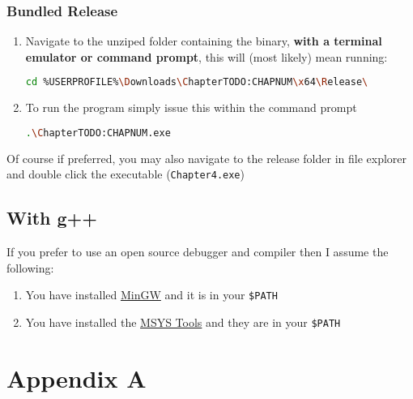 \documentclass[a4paper,11pt]{article}
\begin{document}
      \subsubsection{Bundled Release}
        \begin{enumerate}
          \item Navigate to the unziped folder containing the binary, 
            \textbf{with a terminal emulator or command prompt}, this will
            (most likely) mean running:
            \begin{lstlisting}[language=bash]
              cd %USERPROFILE%\Downloads\ChapterTODO:CHAPNUM\x64\Release\
            \end{lstlisting}
          \item To run the program simply issue this within the command
            prompt
            \begin{lstlisting}[language=bash]
              .\ChapterTODO:CHAPNUM.exe
            \end{lstlisting}
        \end{enumerate}
        Of course if preferred, you may also navigate to the release folder in
          file explorer and double click the executable (\texttt{Chapter4.exe})
      \subsection{With g++}
        If you prefer to use an open source debugger and compiler then I assume
          the following:
          \begin{enumerate}
            \item You have installed \href{http://www.mingw.org/}{MinGW} and
              it is in your \texttt{\$PATH}
            \item You have installed the
            \href{http://www.mingw.org/wiki/MSYS}{MSYS Tools} and they are in
              your \texttt{\$PATH}
          \end{enumerate}


  \newpage
  \appendix

  \section{Appendix A}
\end{document}
